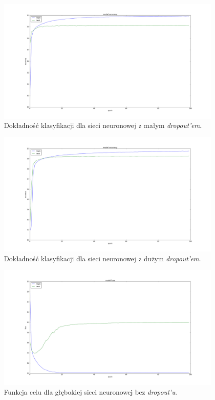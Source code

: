 \documentclass[12pt]{article}
\begin{document}
\begin{figure}[!ht]
\centering
\includegraphics[scale=0.25]{acc_half_dropout}
\caption{Dokładność klasyfikacji dla sieci neuronowej z małym \textit{dropout'em}.}
\label{acc_half_dropout}
\end{figure}

\begin{figure}[!ht]
\centering
\includegraphics[scale=0.25]{acc_dropout}
\caption{Dokładność klasyfikacji dla sieci neuronowej z dużym \textit{dropout'em}.}
\label{acc_dropout}
\end{figure}

\begin{figure}[!ht]
\centering
\includegraphics[scale=0.25]{loss_no_dropout}
\caption{Funkcja celu dla głębokiej sieci neuronowej bez \textit{dropout'u}.}
\label{loss_no_dropout}
\end{figure}
\end{document}

